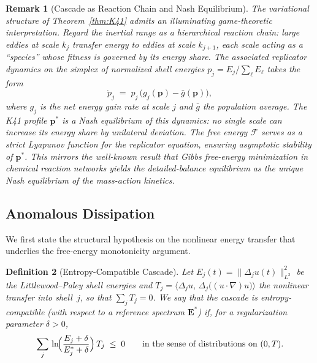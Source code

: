 \documentclass[12pt,a4paper]{article}
\theoremstyle{breakdef}
\newtheorem{definition}{Definition}[section]
\theoremstyle{breakplain}
\theoremstyle{breakdef}
\newtheorem{remark}[definition]{Remark}
\begin{document}
\begin{remark}[Cascade as Reaction Chain and Nash Equilibrium]\label{rem:nash}
The variational structure of Theorem~\ref{thm:K41} admits an illuminating
game-theoretic interpretation.  Regard the inertial range as a
hierarchical \emph{reaction chain}: large eddies at scale $k_j$ transfer
energy to eddies at scale $k_{j+1}$, each scale acting as a ``species''
whose fitness is governed by its energy share.  The associated replicator
dynamics on the simplex of normalized shell energies
$p_j = E_j / \sum_\ell E_\ell$ takes the form
\[
  \dot{p}_j
  \;=\;
  p_j\,\bigl(g_j(\mathbf{p}) - \bar{g}(\mathbf{p})\bigr),
\]
where $g_j$ is the net energy gain rate at scale $j$ and $\bar{g}$ the
population average.  The K41 profile $\mathbf{p}^*$ is a \emph{Nash
equilibrium} of this dynamics: no single scale can increase its energy share
by unilateral deviation.  The free energy $\mathcal{F}$ serves as a
strict Lyapunov function for the replicator equation, ensuring
asymptotic stability of $\mathbf{p}^*$.
This mirrors the well-known result that Gibbs free-energy minimization
in chemical reaction networks yields the detailed-balance equilibrium
as the unique Nash equilibrium of the mass-action kinetics.
\end{remark}

\subsection{Anomalous Dissipation}

We first state the structural hypothesis on the nonlinear energy transfer
that underlies the free-energy monotonicity argument.

\begin{definition}[Entropy-Compatible Cascade]\label{def:NL}
Let $E_j(t) = \|\Delta_j u(t)\|_{L^2}^2$ be the Littlewood--Paley shell
energies and $T_j = \langle \Delta_j u,\, \Delta_j\bigl((u\cdot\nabla)u\bigr)\rangle$
the nonlinear transfer into shell~$j$, so that $\sum_j T_j = 0$.
We say that the cascade is \emph{entropy-compatible} (with respect to a
reference spectrum $\mathbf{E}^*$) if, for a regularization parameter
$\delta > 0$,
\begin{equation}\label{eq:NL}
  \sum_{j}\,\ln\!\Bigl(\frac{E_j + \delta}{E_j^* + \delta}\Bigr)\,T_j
  \;\le\; 0
  \qquad \text{in the sense of distributions on } (0,T).
\end{equation}
\end{definition}
\end{document}
